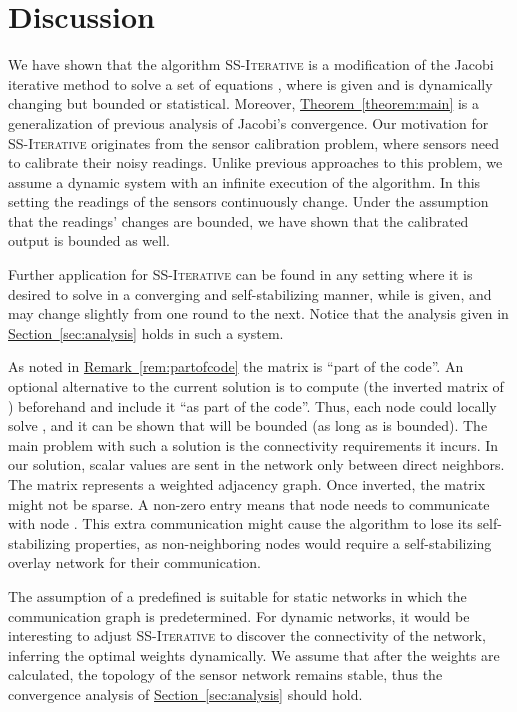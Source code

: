 \documentclass[preprint,12pt]{elsarticle}
\newcommand{\namedref}[2]{\hyperref[#2]{#1~\ref*{#2}}}
\newcommand{\sectionref}[1]{\namedref{Section}{#1}}
\newcommand{\theoremref}[1]{\namedref{Theorem}{#1}}
\newcommand{\remarkref}[1]{\namedref{Remark}{#1}}
\newcommand{\syncAlg}{\textsc{SS-Iterative}\xspace}
\begin{document}
\section{Discussion}\label{sec:discussion}
We have shown that the algorithm \syncAlg is a modification of the
Jacobi iterative method to solve a set of equations ,
where  is given and  is dynamically changing but bounded or statistical.
Moreover, \theoremref{theorem:main} is a generalization of
previous analysis of Jacobi's convergence. Our motivation for
\syncAlg originates from the sensor calibration problem, where
sensors need to calibrate their noisy readings. Unlike previous
approaches to this problem, we assume a dynamic system with an
infinite execution of the algorithm. In this setting the readings
of the sensors continuously change. Under the assumption that the
readings' changes are bounded, we have shown that the calibrated
output is bounded as well.


Further application for \syncAlg can be found in any setting where
it is desired to solve  in a converging and
self-stabilizing manner, while  is given, and  may change
slightly from one round to the next. Notice that the analysis
given in
\sectionref{sec:analysis} holds in such a system.

As noted in \remarkref{rem:partofcode} the matrix  is ``part of
the code''. An optional alternative to the current solution is to
compute  (the inverted matrix of ) beforehand and
include it ``as part of the code''. Thus, each node could locally
solve , and it can be shown that  will be
bounded (as long as  is bounded). The main problem with such
a solution is the connectivity requirements it incurs. In our
solution, scalar values are sent in the network only between
direct neighbors. The matrix  represents a weighted adjacency
graph. Once inverted, the matrix  might not be sparse.
A non-zero entry  means that node  needs
to communicate with node . This extra communication might cause the algorithm to lose its self-stabilizing properties, as
non-neighboring nodes would require a self-stabilizing overlay
network for their communication.

The assumption of a predefined  is suitable for static networks
in which the communication graph is predetermined. For dynamic
networks, it would be interesting to adjust \syncAlg to discover
the connectivity of the network, inferring the optimal weights dynamically.
We assume that after the weights are calculated, the topology of the
sensor network remains stable, thus the convergence analysis of \sectionref{sec:analysis} should hold.
\end{document}
